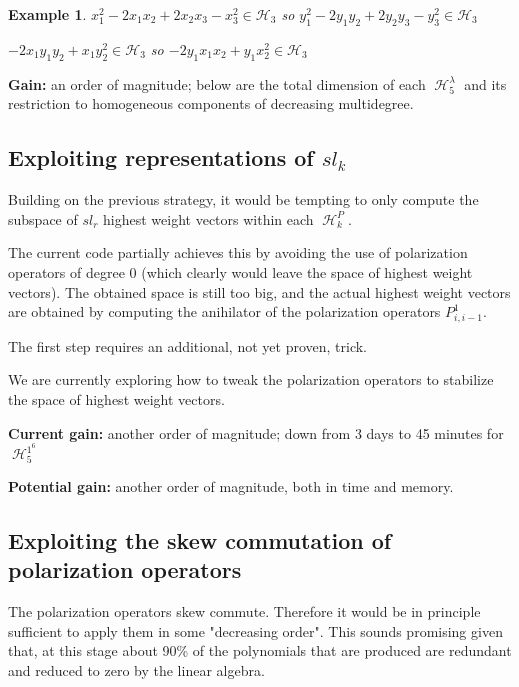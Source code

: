 \documentclass[letter,12pt]{article}
\DeclareMathOperator{\harmonics}{\mathcal{H}}
\newtheorem{example}{Example}
\begin{document}
	\begin{example}
		$x_1^2 - 2x_1x_2 + 2x_2x_3 - x_3^2 \in \mathcal{H}_{3}$ so $y_1^2 - 2y_1y_2 + 2y_2y_3 - y_3^2 \in \mathcal{H}_{3}$
		
		$-2x_{1} y_{1} y_{2} + x_{1} y_{2}^{2} \in \mathcal{H}_{3}$ so $-2y_{1} x_{1} x_{2} + y_{1} x_{2}^{2} \in \mathcal{H}_{3}$
	\end{example}
	
	
	\textbf{Gain:} an order of magnitude; below are the total dimension of each $\harmonics_5^\lambda$ and its restriction to homogeneous components of decreasing multidegree. 
	
	\subsection{Exploiting representations of $sl_k$}
	
	Building on the previous strategy, it would be tempting to only compute the subspace of $sl_r$ highest weight vectors within each $\harmonics_k^P$.
	
	The current code partially achieves this by avoiding the use of polarization operators of degree $0$ (which clearly would leave the space of highest weight vectors). The obtained space is still too big, and the actual highest weight vectors are obtained by computing the anihilator of the polarization operators $P_{i,i-1}^1$.
	
	The first step requires an additional, not yet proven, trick.
	
	We are currently exploring how to tweak the polarization operators to stabilize the space of highest weight vectors.
	
	\textbf{Current gain:} another order of magnitude; down from 3 days to 45 minutes for $\harmonics_5^{1^6}$
	
	\textbf{Potential gain:} another order of magnitude, both in time and memory.
	
	\subsection{Exploiting the skew commutation of polarization operators}
	
	The polarization operators skew commute. Therefore it would be in principle sufficient to apply them in some "decreasing order". This sounds promising given that, at this stage about 90\% of the polynomials that are produced are redundant and reduced to zero by the linear algebra.
	
\end{document}
